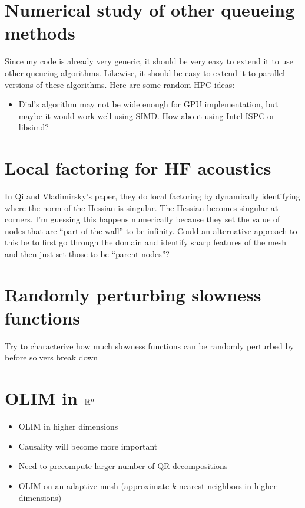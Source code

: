 \documentclass[eikonal.tex]{subfiles}
\begin{document}
\section{Numerical study of other queueing methods}

Since my code is already very generic, it should be very easy to
extend it to use other queueing algorithms. Likewise, it should be
easy to extend it to parallel versions of these algorithms. Here are
some random HPC ideas:
\begin{itemize}
\item Dial's algorithm may not be wide enough for GPU implementation,
  but maybe it would work well using SIMD. How about using Intel ISPC
  or libsimd?
\end{itemize}

\section{Local factoring for HF acoustics}

In Qi and Vladimirsky's paper, they do local factoring by dynamically
identifying where the norm of the Hessian is singular. The Hessian
becomes singular at corners. I'm guessing this happens numerically
because they set the value of nodes that are ``part of the wall'' to
be infinity. Could an alternative approach to this be to first go
through the domain and identify sharp features of the mesh and then
just set those to be ``parent nodes''?

\section{Randomly perturbing slowness functions}

Try to characterize how much slowness functions can be randomly
perturbed by before solvers break down
\section{OLIM in $\mathbb{R}^n$}

\begin{itemize}
\item OLIM in higher dimensions
\item Causality will become more important
\item Need to precompute larger number of QR decompositions
\item OLIM on an adaptive mesh (approximate $k$-nearest neighbors in
  higher dimensions)
\end{itemize}
\end{document}
